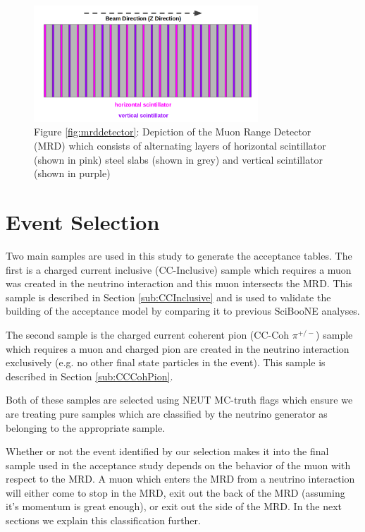 \documentclass[11pt]{article}
\begin{document}
\begin{figure}[H]
\centering
\includegraphics[width=0.75\textwidth]{EventClassifications/mrd.png}
\caption*{Figure \ref*{fig:mrddetector}: Depiction of the Muon Range Detector (MRD) which consists of alternating layers of horizontal scintillator (shown in pink) steel slabs (shown in grey) and vertical scintillator (shown in purple)}
\end{figure}\label{fig:mrddetector}



\section{Event Selection}\label{sec:eventselection}
Two main samples are used in this study to generate the acceptance tables. The first is a charged current inclusive (CC-Inclusive) sample which requires a muon was created in the neutrino interaction and this muon intersects the MRD. This sample is described in Section \ref*{sub:CCInclusive} and is used to validate the building of the acceptance model by comparing it to previous SciBooNE analyses.

The second sample is the charged current coherent pion (CC-Coh $\pi^{+/-}$) sample which requires a muon and charged pion are created in the neutrino interaction exclusively (e.g. no other final state particles in the event). This sample is described in Section \ref*{sub:CCCohPion}.

Both of these samples are selected using NEUT MC-truth flags which ensure we are treating pure samples which are classified by the neutrino generator as belonging to the appropriate sample.

Whether or not the event identified by our selection makes it into the final sample used in the acceptance study depends on the behavior of the muon with respect to the MRD. A muon which enters the MRD from a neutrino interaction will either come to stop in the MRD, exit out the back of the MRD (assuming it's momentum is great enough), or exit out the side of the MRD. In the next sections we explain this classification further.
\end{document}
